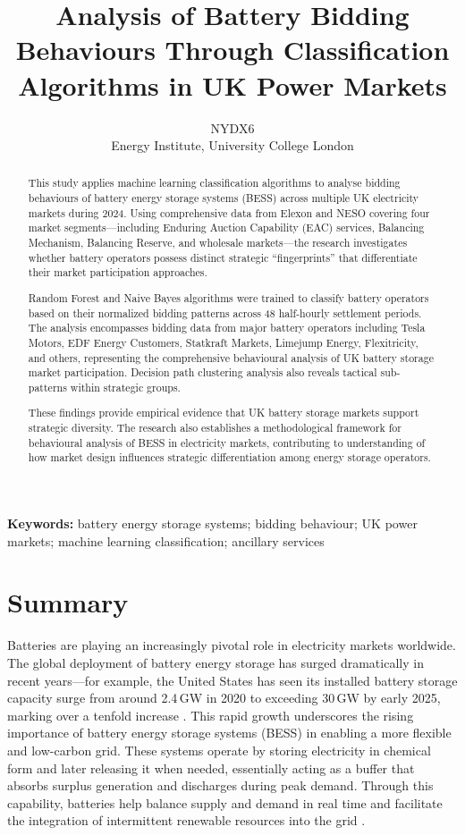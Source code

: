 \documentclass[12pt,a4paper]{article}
\title{Analysis of Battery Bidding Behaviours Through Classification Algorithms in UK Power Markets}
\author{NYDX6\\
Energy Institute, University College London}
\date{}
\begin{document}
\maketitle

\begin{abstract}
This study applies machine learning classification algorithms to analyse bidding behaviours of battery energy storage systems (BESS) across multiple UK electricity markets during 2024. Using comprehensive data from Elexon and NESO covering four market segments---including Enduring Auction Capability (EAC) services, Balancing Mechanism, Balancing Reserve, and wholesale markets---the research investigates whether battery operators possess distinct strategic ``fingerprints'' that differentiate their market participation approaches.

Random Forest and Naive Bayes algorithms were trained to classify battery operators based on their normalized bidding patterns across 48 half-hourly settlement periods. The analysis encompasses bidding data from major battery operators including Tesla Motors, EDF Energy Customers, Statkraft Markets, Limejump Energy, Flexitricity, and others, representing the comprehensive behavioural analysis of UK battery storage market participation. Decision path clustering analysis also reveals tactical sub-patterns within strategic groups.

These findings provide empirical evidence that UK battery storage markets support strategic diversity. The research also establishes a methodological framework for behavioural analysis of BESS in electricity markets, contributing to understanding of how market design influences strategic differentiation among energy storage operators.
\end{abstract}

\noindent\textbf{Keywords:} battery energy storage systems; bidding behaviour; UK power markets; machine learning classification; ancillary services

\section{Summary}
Batteries are playing an increasingly pivotal role in electricity markets worldwide. The global deployment of battery energy storage has surged dramatically in recent years---for example, the United States has seen its installed battery storage capacity surge from around 2.4\,GW in 2020 to exceeding 30\,GW by early 2025, marking over a tenfold increase \cite{eia2024a}. This rapid growth underscores the rising importance of battery energy storage systems (BESS) in enabling a more flexible and low-carbon grid. These systems operate by storing electricity in chemical form and later releasing it when needed, essentially acting as a buffer that absorbs surplus generation and discharges during peak demand. Through this capability, batteries help balance supply and demand in real time and facilitate the integration of intermittent renewable resources into the grid \cite{martins2021}.
\end{document}
